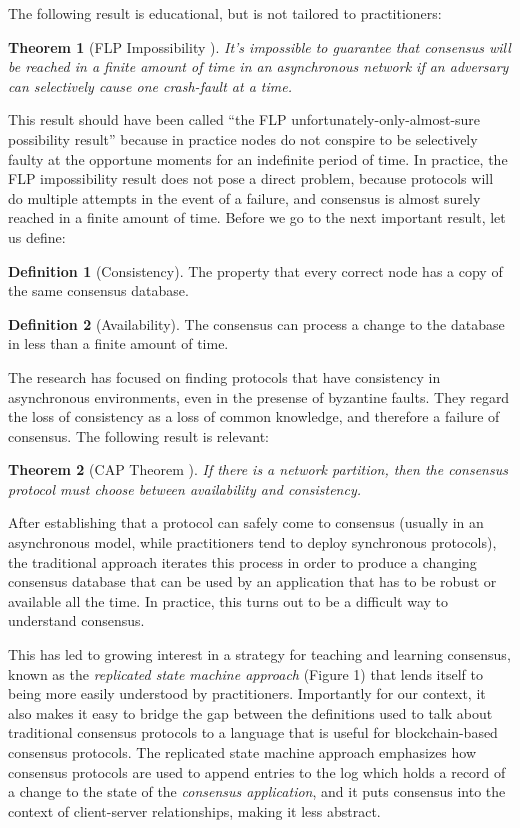 \documentclass[11pt,a4paper]{article}
\theoremstyle{plain}
\newtheorem{thm}{Theorem}
\theoremstyle{definition}
\newtheorem{defn}{Definition}
\begin{document}
The following result is educational, but is not tailored to practitioners:

\begin{thm}[FLP Impossibility \cite{FLP}]
It's impossible to guarantee that consensus will be reached in a finite amount of time in an asynchronous network if an adversary can selectively cause one crash-fault at a time.
\end{thm}

This result should have been called ``the FLP unfortunately-only-almost-sure possibility result'' because in practice nodes do not conspire to be selectively faulty at the opportune moments for an indefinite period of time. In practice, the FLP impossibility result does not pose a direct problem, because protocols will do multiple attempts in the event of a failure, and consensus is almost surely reached in a finite amount of time. Before we go to the next important result, let us define:

\begin{defn}[Consistency]
The property that every correct node has a copy of the same consensus database.
\end{defn}

\begin{defn}[Availability]
The consensus can process a change to the database in less than a finite amount of time.
\end{defn}

The research has focused on finding protocols that have consistency in asynchronous environments, even in the presense of byzantine faults. They regard the loss of consistency as a loss of common knowledge, and therefore a failure of consensus. The following result is relevant:

\begin{thm}[CAP Theorem \cite{CAP}]
If there is a network partition, then the consensus protocol must choose between availability and consistency.
\end{thm}

After establishing that a protocol can safely come to consensus (usually in an asynchronous model, while practitioners tend to deploy synchronous protocols), the traditional approach iterates this process in order to produce a changing consensus database that can be used by an application that has to be robust or available all the time. In practice, this turns out to be a difficult way to understand consensus.

This has led to growing interest in a strategy for teaching and learning consensus, known as the \emph{replicated state machine approach} (Figure 1) that lends itself to being more easily understood by practitioners. Importantly for our context, it also makes it easy to bridge the gap between the definitions used to talk about traditional consensus protocols to a language that is useful for blockchain-based consensus protocols. The replicated state machine approach emphasizes how consensus protocols are used to append entries to the log which holds a record of a change to the state of the \emph{consensus application}, and it puts consensus into the context of client-server relationships, making it less abstract.
\end{document}
